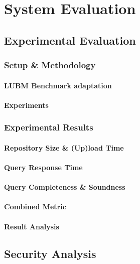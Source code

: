 
\chapter{System Evaluation}
\label{cha:evaluation}


\section{Experimental Evaluation}
\subsection{Setup \& Methodology}
\subsubsection{LUBM Benchmark adaptation}
\subsubsection{Experiments}
\subsection{Experimental Results}
\subsubsection{Repository Size \& (Up)load Time}
\subsubsection{Query Response Time}
\subsubsection{Query Completeness \& Soundness}
\subsubsection{Combined Metric}
\subsubsection{Result Analysis}

\section{Security Analysis}

